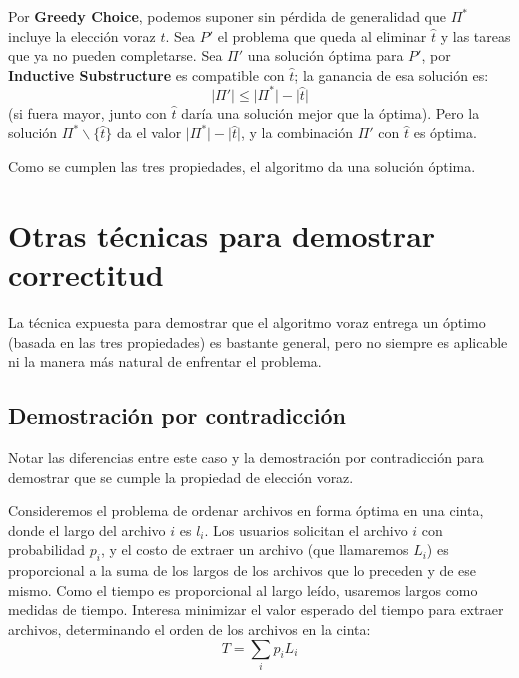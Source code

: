 \begin{description}
    Por \textbf{Greedy Choice},
    podemos suponer sin pérdida de generalidad
    que \(\Pi^*\) incluye la elección voraz \(\hat{t}\).
    Sea \(P'\) el problema que queda al eliminar \(\hat{t}\)
    y las tareas que ya no pueden completarse.
    Sea \(\Pi'\) una solución óptima para \(P'\),
    por \textbf{Inductive Substructure} es compatible con \(\hat{t}\);
    la ganancia de esa solución es:
    \begin{equation*}
      \lvert \Pi' \rvert
        \le \lvert \Pi^* \rvert
               - \lvert \hat{t} \rvert
    \end{equation*}
    (si fuera mayor,
     junto con \(\hat{t}\) daría una solución mejor que la óptima).
    Pero la solución \(\Pi^* \smallsetminus \{ \hat{t} \}\)
    da el valor \(\lvert \Pi^* \rvert - \lvert \hat{t} \rvert\),
    y la combinación \(\Pi'\) con \(\hat{t}\) es óptima.
  \end{description}
  Como se cumplen las tres propiedades,
  el algoritmo da una solución óptima.

\section{Otras técnicas para demostrar correctitud}
\label{sec:greedy-otras-tecnicas}

  La técnica expuesta para demostrar que el algoritmo voraz entrega un óptimo
  (basada en las tres propiedades)
  es bastante general,
  pero no siempre es aplicable
  ni la manera más natural de enfrentar el problema.

\subsection{Demostración por contradicción}
\label{sec:demostr-por-contradiccion}

  Notar las diferencias entre este caso
  y la demostración por contradicción
  para demostrar que se cumple la propiedad de elección voraz.

  Consideremos el problema de ordenar archivos en forma óptima en una cinta,
  donde el largo del archivo \(i\) es \(l_i\).
  Los usuarios solicitan el archivo \(i\) con probabilidad \(p_i\),
  y el costo de extraer un archivo
  (que llamaremos \(L_i\))
  es proporcional a la suma de los largos de los archivos que lo preceden
  y de ese mismo.
  Como el tiempo es proporcional al largo leído,
  usaremos largos como medidas de tiempo.
  Interesa minimizar el valor esperado del tiempo para extraer archivos,
  determinando el orden de los archivos en la cinta:
  \begin{equation*}
    T
      = \sum_i p_i L_i
  \end{equation*}

